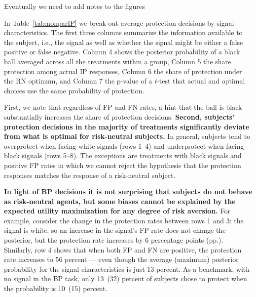 \documentclass[12pt,a4paper]{article}
\newcommand{\pmt}[1]{{\color{Blue}#1}}
\begin{document}
\pmt{Eventually we need to add notes to the figures}

In Table~\ref{tab:nonparIP} we break out average protection decisions by signal characteristics. The first three columns summarize the information available to the subject, i.e., the signal as well as whether the signal might be either a false positive or false negative. Column 4 shows the posterior probability of a black ball averaged across all the treatments within a group, Column 5 the share protection among actual IP responses, Column 6 the share of protection under the RN optimum, and Column 7 the p-value of a \emph{t-}test that actual and optimal choices use the same probability of protection.

First, we note that regardless of FP and FN rates, a hint that the ball is black substantially increases the share of protection decisions.  \textbf{Second, subjects' protection decisions in the majority of treatments significantly deviate from what is optimal for risk-neutral subjects.}  In general, subjects tend to overprotect when facing white signals (rows 1--4) and underprotect when facing black signals (rows 5--8). The exceptions are treatments with black signals and positive FP rates in which we cannot reject the hypothesis that the protection responses matches the response of a risk-neutral subject. 

\textbf{In light of BP decisions it is not surprising that subjects do not behave as risk-neutral agents, but some biases cannot be explained by the expected utility maximization for any degree of risk aversion.} For example, consider the change in the protection rates between rows 1 and 3: the signal is white, so an increase in the signal's FP rate does not change the posterior, but the protection rate increases by 6 percentage points (pp.). Similarly, row 4 shows that when both FP and FN are positive, the protection rate increases to 56 percent --- even though the average (maximum) posterior probability for the signal characteristics is just 13 percent. As a benchmark, with no signal in the BP task, only 13~(32) percent of subjects chose to protect when the probability is 10~(15) percent. 

\end{document}
